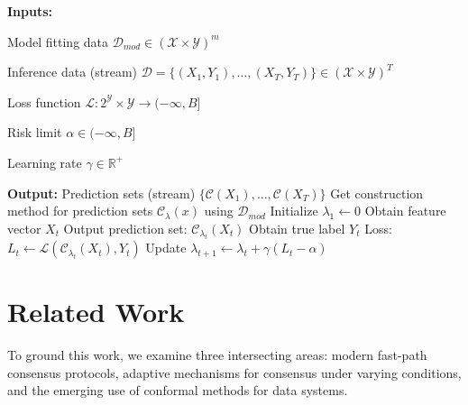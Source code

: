 \begin{algorithm}[t]
    \begin{algorithmic}[1]
        \vspace{1mm}
        \Statex \textbf{Inputs:}
        \Statex \hspace{\algorithmicindent}
        \begin{minipage}[t]{0.92\linewidth}
            Model fitting data
            $\mathcal{D}_{mod} \in (\mathcal{X} \times \mathcal{Y})^m$
            
            Inference data (stream)
            $\mathcal{D} = \{(X_1, Y_1), \dots, (X_T, Y_T)\}\in (\mathcal{X} \times \mathcal{Y})^T$
            
            Loss function
            $\mathcal{L}: 2^{\mathcal{Y}} \times \mathcal{Y} \rightarrow (-\infty, B]$
            
            Risk limit
            $\alpha\in(-\infty, B]$

            Learning rate
            $\gamma \in \mathbb{R}^+$
        \end{minipage}
        \vspace{1mm}
        \Statex \textbf{Output:}
        \Statex \hspace{\algorithmicindent}
        Prediction sets (stream) $\{\mathcal C(X_1), \dots, \mathcal{C}(X_T)\}$
        \Statex \hrulefill
        \State Get construction method for prediction sets $\mathcal{C}_\lambda(x)$ using $\mathcal{D}_{mod}$
        \State Initialize $\lambda_1 \leftarrow 0$
            \State Obtain feature vector $X_t$
            \State Output prediction set: $\mathcal{C}_{\lambda_t}(X_t)$
            \State Obtain true label $Y_t$
            \State Loss: $L_t \leftarrow \mathcal{L}(\mathcal{C}_{\lambda_t}(X_t),Y_t)$
            \State Update $\lambda_{t+1} \leftarrow \lambda_t + \gamma(L_t - \alpha)$
        \EndFor
    \end{algorithmic}
    \caption{Rolling Risk Control for Classification}
    \label{alg:rolling_risk_control}
\end{algorithm}

\section{Related Work}
\label{sec:related_work}

To ground this work, we examine three intersecting areas: modern fast-path consensus protocols, adaptive mechanisms for consensus under varying conditions, and the emerging use of conformal methods for data systems.

